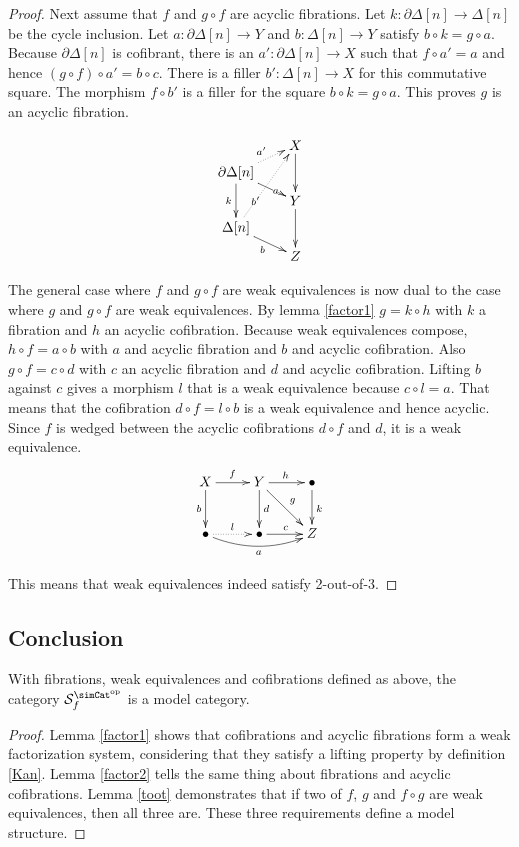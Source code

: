 \documentclass{tac}
\newcommand\cat\mathcal
\newcommand\dual{^{\mathrm{op}}}
\newcommand\s{^{\simCat\dual}}
\newcommand\of{:}
\newcommand\simplex\Delta
\newcommand\cycle{\partial\Delta}
\newcommand\f{_f}
\begin{document}
\begin{proof}
Next assume that $f$ and $g\circ f$ are acyclic fibrations. Let $k\of\cycle[n]\to\simplex[n]$ be the cycle inclusion. Let $a\of\cycle[n]\to Y$ and $b\of\simplex[n]\to Y$ satisfy $b\circ k = g \circ a$. Because $\cycle[n]$ is cofibrant, there is an $a'\of \cycle[n]\to X$ such that $f\circ a' = a$ and hence $(g\circ f)\circ a' = b\circ c$. There is a filler $b'\of\simplex[n]\to X$ for this commutative square. The morphism $f\circ b'$ is a filler for the square $b\circ k = g \circ a$. This proves $g$ is an acyclic fibration.

\[\xy
(14\halfrootthree,28)*+{X}="x", (0,21)*+{\cycle[n]}="v", (14\halfrootthree,14)*+{Y}="y", (0,7)*+{\simplex[n]}="w", (14\halfrootthree,0)*+{Z}="z"
\ar@{.>}^{a'} "v";"x" \ar|(.67)a "v";"y" \ar_k "v";"w"
\ar@{.>}|(.33){b'} "w";"x" \ar_b "w";"z"
\ar "x";"y" \ar "y";"z"
\endxy\]

The general case where $f$ and $g\circ f$ are weak equivalences is now dual to the case where $g$ and $g\circ f$ are weak equivalences. By lemma \ref{factor1} $g=k\circ h$ with $k$ a fibration and $h$ an acyclic cofibration. Because weak equivalences compose, $h\circ f = a\circ b$ with $a$ and acyclic fibration and $b$ and acyclic cofibration. 
Also $g\circ f = c\circ d$ with $c$ an acyclic fibration and $d$ and acyclic cofibration. 
Lifting $b$ against $c$ gives a morphism $l$ that is a weak equivalence because $c\circ l = a$. That means that the cofibration $d\circ f = l\circ b$ is a weak equivalence and hence acyclic. Since $f$ is wedged between the acyclic cofibrations $d\circ f$ and $d$, it is a weak equivalence. 
\[\xymatrix{
X\ar[r]^f\ar[d]_b & Y\ar[r]^h\ar[d]^d\ar[dr]^g & \bullet\ar[d]^k\\
\bullet\ar@/_2ex/[rr]_a\ar@{.>}[r]^l & \bullet\ar[r]^c & Z
}\]%

This means that weak equivalences indeed satisfy 2-out-of-3.
\end{proof}

\subsection{Conclusion}

\begin{theorem}
With fibrations, weak equivalences and cofibrations defined as above, the category $\cat S\s\f$ is a model category.
\label{model category}
\end{theorem}

\begin{proof}
Lemma \ref{factor1} shows that cofibrations and acyclic fibrations form a weak factorization system, considering that they satisfy a lifting property by definition \ref{Kan}. Lemma \ref{factor2} tells the same thing about fibrations and acyclic cofibrations. Lemma \ref{toot} demonstrates that if two of $f$, $g$ and $f\circ g$ are weak equivalences, then all three are. These three requirements define a model structure.
\end{proof}
\end{document}
